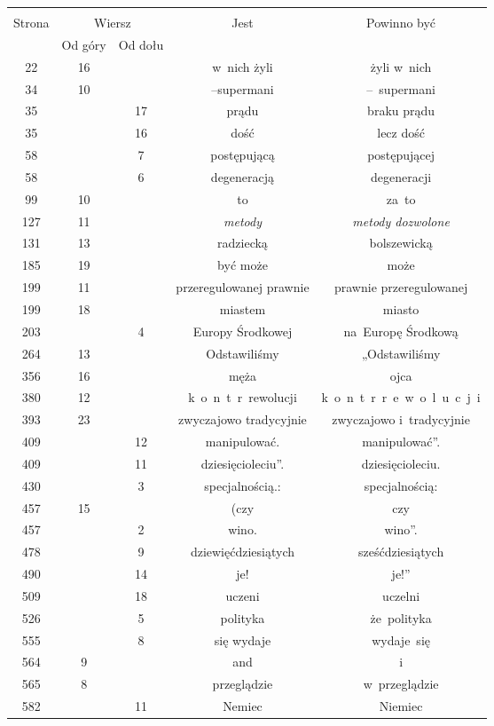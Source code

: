 \documentclass[a4paper,11pt]{article}
\begin{document}
\begin{center}

  \begin{tabular}{|c|c|c|c|c|}
    \hline
    & \multicolumn{2}{c|}{} & & \\
    Strona & \multicolumn{2}{c|}{Wiersz} & Jest
                              & Powinno być \\ \cline{2-3}
    & Od góry & Od dołu & & \\
    \hline
    22  & 16 & & w~nich żyli & żyli w~nich \\
    34  & 10 & & --supermani & --~supermani \\
    35  & & 17 & prądu & braku prądu \\
    35  & & 16 & dość & lecz dość \\
    58  & &  7 & postępującą & postępującej \\
    58  & &  6 & degeneracją & degeneracji \\
    99  & 10 & & to & za~to \\
    127 & 11 & & \textit{metody} & \textit{metody dozwolone} \\
    131 & 13 & & radziecką & bolszewicką \\
    185 & 19 & & być może & może \\
    199 & 11 & & przeregulowanej prawnie & prawnie przeregulowanej \\
    199 & 18 & & miastem & miasto \\
    203 & &  4 & Europy Środkowej & na~Europę Środkową \\
    264 & 13 & & Odstawiliśmy & „Odstawiliśmy \\
    356 & 16 & & męża & ojca \\
    380 & 12 & & k~o~n~t~r~rewolucji & k~o~n~t~r~r~e~w~o~l~u~c~j~i \\
    393 & 23 & & zwyczajowo tradycyjnie & zwyczajowo i~tradycyjnie \\
    409 & & 12 & manipulować. & manipulować''. \\
    409 & & 11 & dziesięcioleciu''. & dziesięcioleciu. \\
    430 & &  3 & specjalnością.: & specjalnością: \\
    457 & 15 & & (czy & czy \\
    457 & &  2 & wino. & wino''. \\
    478 & &  9 & dziewięćdziesiątych & sześćdziesiątych \\
    490 & & 14 & je! & je!'' \\
    509 & & 18 & uczeni & uczelni \\
    526 & &  5 & polityka & że~polityka \\
    555 & &  8 & się wydaje & wydaje~się \\
    564 &  9 & & and & i \\
    565 &  8 & & przeglądzie & w~przeglądzie \\
    582 & & 11 & Nemiec & Niemiec \\
    \hline
  \end{tabular}






\end{center}
\end{document}
